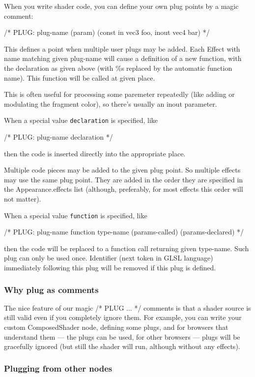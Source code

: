 \documentclass{acmsiggraph}                     %
\begin{document}
When you write shader code, you can define your own plug points by a
magic comment:

/* PLUG: plug-name (param) (const in vec3 foo, inout vec4 bar) */

This defines a point when multiple user plugs may be added. Each
Effect with name matching given plug-name will cause a
definition of a new function, with the declaration as given above
(with \%s replaced by the automatic function name). This function will
be called at given place.

This is often useful for processing some paremeter
repeatedly (like adding or modulating the fragment color),
so there's usually an inout parameter.

When a special value \texttt{declaration} is specified, like

/* PLUG: plug-name declaration */

then the code is inserted directly into the appropriate place.

Multiple code pieces may be added to the given plug point.
So multiple effects may use the same plug point. They are added
in the order they are specified in the Appearance.effects list
(although, preferably, for most effects this order will not matter).

When a special value \texttt{function} is specified, like

/* PLUG: plug-name function type-name (params-called) (params-declared) */

then the code will be replaced to a function call returning given type-name.
Such plug can only be used once.
Identifier (next token in GLSL language) immediately following
this plug will be removed if this plug is defined.

\subsubsection{Why plug as comments}

The nice feature of our magic /* PLUG ... */ comments is that a shader source
is still valid even if you completely ignore them. For example,
you can write your custom ComposedShader node, defining some plugs,
and for browsers that understand them --- the plugs can be used,
for other browsers --- plugs will be gracefully ignored (but still
the shader will run, although without any effects).

\subsubsection{Plugging from other nodes}
\end{document}
